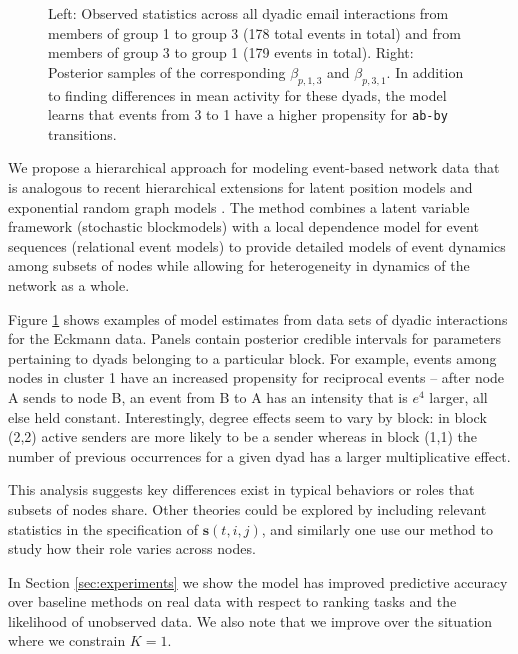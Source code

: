 \documentclass{article}
\begin{document}
\begin{figure}[t]
\caption{%
 Left: Observed statistics across all dyadic email interactions from members of group 1 to group 3 (178 total events in total) and from members of group 3 to group 1 (179 events in total).  Right: Posterior samples of the corresponding $\beta_{p,1,3}$ and $\beta_{p,3,1}$.  In addition to finding differences in mean activity for these dyads, the model learns that events from 3 to 1 have a higher propensity for \texttt{ab-by} transitions.}
\label{fig:posteriorparams}
\end{figure}

 We propose a hierarchical approach for modeling event-based network data that is analogous to recent hierarchical extensions for latent position models \cite{Handcock2007} and exponential random graph models \cite{Schweinberger2011}.  The method combines a latent variable framework (stochastic blockmodels) with a local dependence model for event sequences (relational event models) to provide detailed models of event dynamics among subsets of nodes while allowing for heterogeneity in dynamics of the network as a whole.

Figure \ref{fig:posteriorparams} shows examples of model estimates from data sets of dyadic interactions for the Eckmann data. Panels contain posterior credible intervals for parameters pertaining to dyads belonging to a particular block.  For example, events among nodes in cluster 1 have an increased propensity for reciprocal events -- after node A sends to node B, an event from B to A has an intensity that is $e^4$ larger, all else held constant.  Interestingly, degree effects seem to vary by block: in block (2,2) active senders are more likely to be a sender whereas in block (1,1) the number of previous occurrences for a given dyad has a larger multiplicative effect.  

This analysis suggests key differences exist in typical behaviors or roles that subsets of nodes share.  Other theories could be explored by including relevant statistics in the specification of $\mathbf{s}(t,i,j)$, and similarly one use our method to study how their role varies across nodes.

In Section \ref{sec:experiments} we show the model has improved predictive accuracy over baseline methods on real data with respect to ranking tasks and the likelihood of unobserved data.  We also note that we improve over the situation where we constrain $K=1$.
\end{document}
